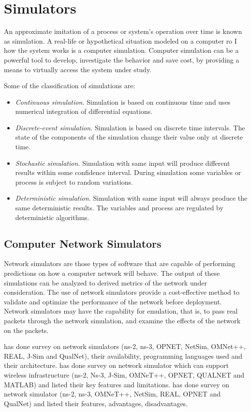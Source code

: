 \section{Simulators}

An approximate imitation of a process or system's operation over time is known as simulation. A real-life or hypothetical situation modeled on a computer ro I how the system works is a computer simulation. Computer simulation can be a powerful tool to develop, investigate the behavior and save cost, by providing a means to virtually access the system under study.

Some of the classification of simulations are:
\begin{itemize}
	\item \textit{Continuous simulation.} Simulation is based on continuous time and uses numerical integration of differential equations.
	\item \textit{Discrete-event simulation.} Simulation is based on discrete time intervals. The state of the components of the simulation change their value only at discrete time. 
	\item \textit{Stochastic simulation.} Simulation with same input will produce different results within some confidence interval. During simulation some variables or process is subject to random variations.
	\item \textit{Deterministic simulation.} Simulation with same input will always produce the same deterministic results. The variables and process are regulated by deterministic algorithms.
\end{itemize}

\subsection{Computer Network Simulators}

Network simulators are those types of software that are capable of performing predictions on how a computer network will behave. The output of these simulations can be analyzed to derived metrics of the network under consideration. The use of network simulators provide a cost-effective method to validate and optimize the performance of the network before deployment. Network simulators may have the capability for emulation, that is, to pass real packets through the network simulation, and examine the effects of the network on the packets. 

 has done survey on network simulators (ns-2, ns-3, OPNET, NetSim, OMNet++, REAL, J-Sim and QualNet), their availability, programming languages used and their architecture.   has done survey on network simulator which can support wireless infrastructure (ns-2, Ns-3, J-Sim, OMNeT++, OPNET, QUALNET and MATLAB) and listed their key features and limitations.  has done survey on network simulator (ns-2, ns-3, OMNeT++, NetSim, REAL, OPNET and QualNet) and listed their features, advantages, disadvantages.

